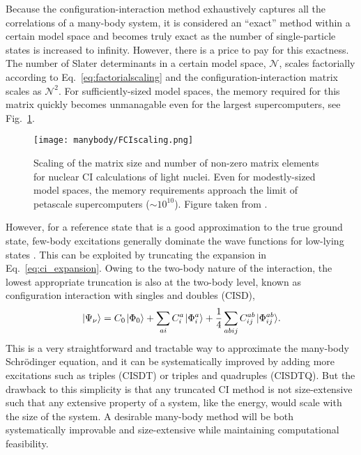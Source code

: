 \documentclass[thesis.tex]{subfiles}
\begin{document}
Because the configuration-interaction method exhaustively captures all the correlations of a many-body system, it is considered an ``exact'' method within a certain model space and becomes truly exact as the number of single-particle states is increased to infinity.  However, there is a price to pay for this exactness.  The number of Slater determinants in a certain model space, $\mathcal{N}$, scales factorially according to Eq.\ \eqref{eq:factorialscaling} and the configuration-interaction matrix scales as $\mathcal{N}^{2}$.  For sufficiently-sized model spaces, the memory required for this matrix quickly becomes unmanagable even for the largest supercomputers, see Fig.\ \ref{fig:fciscaling}.
\begin{figure}[h]
  \centering
  \texttt{[image: manybody/FCIscaling.png]}
  \caption{Scaling of the matrix size and number of non-zero matrix elements for nuclear CI calculations of light nuclei.  Even for modestly-sized model spaces, the memory requirements approach the limit of petascale supercomputers ($\sim 10^{10}$).  Figure taken from \cite{SHAO2016}.}
  \label{fig:fciscaling}
\end{figure}

However, for a reference state that is a good approximation to the true ground state, few-body excitations generally dominate the wave functions for low-lying states \cite{SHERRILL1999143}.  This can be exploited by truncating the expansion in Eq.\ \eqref{eq:ci_expansion}.  Owing to the two-body nature of the interaction, the lowest appropriate truncation is also at the two-body level, known as configuration interaction with singles and doubles (CISD),
\begin{equation} \label{eq:cisd_expansion}
  \ket{\Psi_{\nu}} = C_{0}\ket{\Phi_{0}} + \sum_{\mathclap{a i}} C^{a}_{i}\ket{\Phi^{a}_{i}} + \frac{1}{4}\sum_{\mathclap{a b i j}} C^{ab}_{ij}\ket{\Phi^{ab}_{ij}}.
\end{equation}
This is a very straightforward and tractable way to approximate the many-body Schr\"{o}dinger equation, and it can be systematically improved by adding more excitations such as triples (CISDT) or triples and quadruples (CISDTQ).  But the drawback to this simplicity is that any truncated CI method is not size-extensive such that any extensive property of a system, like the energy, would scale with the size of the system.  A desirable many-body method will be both systematically improvable and size-extensive while maintaining computational feasibility.
\end{document}
